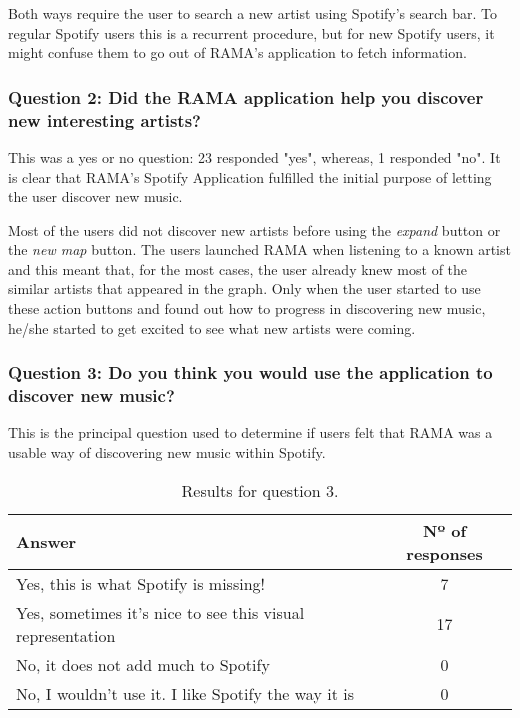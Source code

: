       Both ways require the user to search a new artist using Spotify's search bar.
      To regular Spotify users this is a recurrent procedure, but for new Spotify users, it might confuse them to go out of RAMA's application to fetch information.
    
    \subsubsection{Question 2: Did the RAMA application help you discover new interesting artists?}
    \label{ssub:question_2}

      This was a yes or no question: 23 responded "yes", whereas, 1 responded "no".
      It is clear that RAMA's Spotify Application fulfilled the initial purpose of letting the user discover new music.

      Most of the users did not discover new artists before using the \emph{expand} button or the \emph{new map} button.
      The users launched RAMA when listening to a known artist and this meant that, for the most cases, the user already knew most of the similar artists that appeared in the graph.
      Only when the user started to use these action buttons and found out how to progress in discovering new music, he/she started to get excited to see what new artists were coming.

    \subsubsection{Question 3: Do you think you would use the application to discover new music?}
    \label{ssub:question_3}

      This is the principal question used to determine if users felt that RAMA was a usable way of discovering new music within Spotify.

      \begin{table}[H]
         \begin{center}
           \begin{tabular}{l|c}
       
           \hline
           \textbf{Answer} & \textbf{Nº of responses} \\
           \hline

           \hline
            Yes, this is what Spotify is missing! & 7 \\
            Yes, sometimes it's nice to see this visual representation & 17 \\
            No, it does not add much to Spotify & 0 \\
            No, I wouldn't use it. I like Spotify the way it is & 0 \\
           \hline
           \end{tabular}
         \end{center}
         \caption{Results for question 3.}
         \label{tab:question3}
       \end{table}

